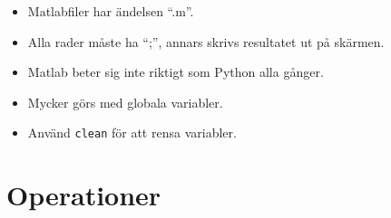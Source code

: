 \begin{frame}
  \begin{remark}[Egenheter]
    \begin{itemize}
      \item Matlabfiler har ändelsen \enquote{.m}.
      \item Alla rader måste ha \enquote{;}, annars skrivs resultatet ut på 
        skärmen.
      \item Matlab beter sig inte riktigt som Python alla gånger.
      \item Mycker görs med globala variabler.
      \item Använd \texttt{clean} för att rensa variabler.
    \end{itemize}
  \end{remark}
\end{frame}


\section{Operationer}

